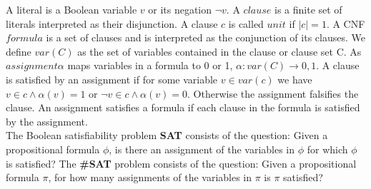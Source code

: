 \documentclass[a4paper, 12pt, bibliography=totoc]{scrartcl}
\begin{document}
A literal is a Boolean variable $v$ or its negation $\neg v$. A $clause$ is a finite set of literals interpreted as their disjunction. A clause $c$ is called $unit$ if $|c|=1$. A CNF $formula$ is a set of clauses and is interpreted as the conjunction of its clauses. We define $var(C)$ as the set of variables contained in the clause or clause set C. As $assignment \alpha$ maps variables in a formula to 0 or 1, $\alpha : var(C)\rightarrow 0,1$. A clause is satisfied by an assignment if for some variable $v \in var(c)$ we have $v \in c \land \alpha (v)=1$ {or} $\neg v \in c \land \alpha(v)=0$. Otherwise the assignment falsifies the clause. An assignment satisfies a formula if each clause in the formula is satisfied by the assignment. \\

The Boolean satisfiability problem \textbf{SAT} consists of the question: Given a propositional formula $\phi$, is there an assignment of the variables in $\phi$ for which $\phi$ is satisfied?
The \textbf{\#SAT} problem consists of the question: Given a propositional formula $\pi$, for how many assignments of the variables in $\pi$ is $\pi$ satisfied?

\end{document}

